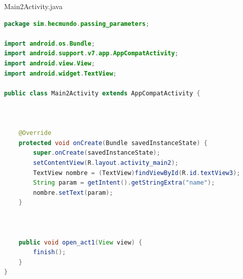 \documentclass{report}
\begin{document}
Main2Activity.java
\begin{lstlisting}[language=java]
package sim.hecmundo.passing_parameters;

import android.os.Bundle;
import android.support.v7.app.AppCompatActivity;
import android.view.View;
import android.widget.TextView;

public class Main2Activity extends AppCompatActivity {



    @Override
    protected void onCreate(Bundle savedInstanceState) {
        super.onCreate(savedInstanceState);
        setContentView(R.layout.activity_main2);
        TextView nombre = (TextView)findViewById(R.id.textView3);
        String param = getIntent().getStringExtra("name");
        nombre.setText(param);
    }



    public void open_act1(View view) {
        finish();
    }
}
\end{lstlisting}
\end{document}
